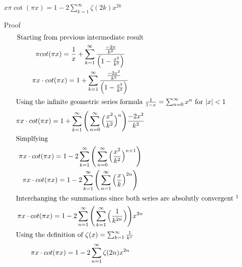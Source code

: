 \documentclass[a4paper]{article}
\begin{document}
\begin{theorem} \label{spf:cot series zeta}
$\boxed{x \pi \cot(\pi x) = 1 - 2 \sum_{k=1}^{\infty} \zeta(2k) x^{2k}
}$

Proof\\
\begin{gather*}
\text{Starting from previous intermediate result}
\\
\pi cot(\pi x) = \frac{1}{x} + \sum_{k=1}^{\infty} \frac{\frac{-2x}{k^2}}{\Big( 1-\frac{x^2}{k^2} \Big)} 
\\
\pi x \cdot cot(\pi x) = 1 + \sum_{k=1}^{\infty} \frac{\frac{-2x^2}{k^2}}{\Big( 1-\frac{x^2}{k^2} \Big)} 
\\
\intertext{Using the infinite geometric series formula $\frac{1}{1-x} = \sum_{n=0}^{\infty} x^n $ for $|x| < 1$}
\pi x \cdot cot(\pi x) = 1 + \sum_{k=1}^{\infty} \Bigg( \sum_{n=0}^{\infty} \Big( \frac{x^2}{k^2} \Big)^n \Bigg) \frac{-2x^2}{k^2}  
\\
\intertext{Simplfying}
\pi x \cdot cot(\pi x) = 1 - 2 \sum_{k=1}^{\infty} \Bigg( \sum_{n=0}^{\infty} \Big( \frac{x^2}{k^2} \Big)^{n+1} \Bigg)
\\
\pi x \cdot cot(\pi x) = 1 - 2 \sum_{k=1}^{\infty} \Bigg( \sum_{n=1}^{\infty} \Big( \frac{x}{k} \Big)^{2n} \Bigg)
\\
\intertext{Interchanging the summations since both series are absolutly convergent \footnotemark}
\pi x \cdot cot(\pi x) = 1 - 2 \sum_{n=1}^{\infty} \Bigg( \sum_{k=1}^{\infty} \Big( \frac{1}{k^{2n}} \Big) \Bigg) x^{2n}
\\
\intertext{Using the definition of $\zeta(x) = \sum_{k=1}^{\infty} \frac{1}{k^x}$}
\pi x \cdot cot(\pi x) = 1 - 2 \sum_{n=1}^{\infty} \zeta(2n) x^{2n}
\end{gather*}
\end{theorem}

\end{document}
